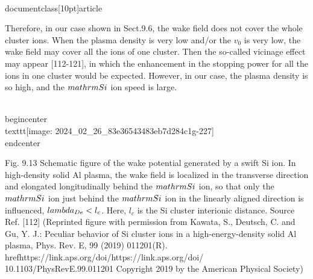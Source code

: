 \\documentclass[10pt]{article}
\begin{document}
{{{{{{Therefore, in our case shown in Sect.9.6, the wake field does not cover the whole cluster ions. When the plasma density is very low and/or the $v_{0}$ is very low, the wake field may cover all the ions of one cluster. Then the so-called vicinage effect may appear [112-121], in which the enhancement in the stopping power for all the ions in one cluster would be expected. However, in our case, the plasma density is so high, and the $\\mathrm{Si}$ ion speed is large.

\\begin{center}
\\texttt{[image: 2024\_02\_26\_83e36543483eb7d284c1g-227]}
\\end{center}

Fig. 9.13 Schematic figure of the wake potential generated by a swift Si ion. In high-density solid Al plasma, the wake field is localized in the transverse direction and elongated longitudinally behind the $\\mathrm{Si}$ ion, so that only the $\\mathrm{Si}$ ion just behind the $\\mathrm{Si}$ ion in the linearly aligned direction is influenced, $\\lambda_{D e}<l_{c}$. Here, $l_{c}$ is the Si cluster interionic distance. Source Ref. [112] (Reprinted figure with permission from Kawata, S., Deutsch, C. and Gu, Y. J.: Peculiar behavior of Si cluster ions in a high-energy-density solid Al plasma, Phys. Rev. E, 99 (2019) 011201(R). \\href{https://link.aps.org/doi/}{https://link.aps.org/doi/} 10.1103/PhysRevE.99.011201 Copyright 2019 by the American Physical Society)

}}}}}}
\end{document}
